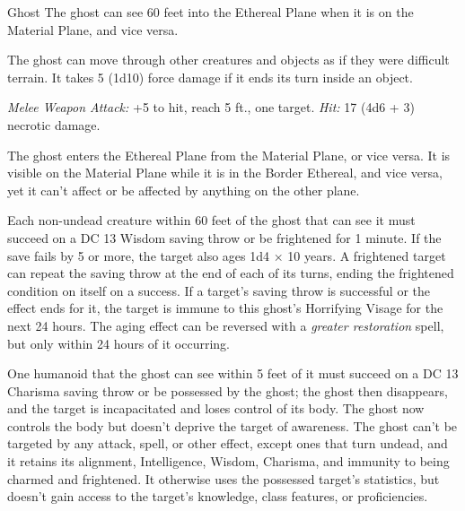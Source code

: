\documentclass[10pt,a4paper,twoside,fancy,bg=print,twocolumn,openany,nodeprecatedcode]{dndbook}
\begin{document}
\begin{DndMonster}[float=t]{Ghost}
\DndMonsterBasics[
armor-class = {11},
hit-points = {\DndDice{10d8}},
speed = {0 ft., fly 40 ft. \textit{(hover)}}
]
\DndMonsterAbilityScores[
 str = 7,
 dex = 13,
 con = 10,
 int = 10,
 wis = 12,
 cha = 17
]
\DndMonsterDetails[
damage-resistances = {acid, fire, lightning, thunder; bludgeoning, piercing, slashing from nonmagical attacks},
damage-immunities = {cold, necrotic, poison},
senses = {darkvision 60 ft., passive perception 11},
languages = {any languages it knew in life},
challenge = 4,
]
The ghost can see 60 feet into the Ethereal Plane when it is on the Material Plane, and vice versa.

The ghost can move through other creatures and objects as if they were difficult terrain. It takes 5 (1d10) force damage if it ends its turn inside an object.

\textsl{Melee Weapon Attack:} +5 to hit, reach 5 ft., one target. \textsl{Hit:} 17 (4d6 + 3) necrotic damage.

The ghost enters the Ethereal Plane from the Material Plane, or vice versa. It is visible on the Material Plane while it is in the Border Ethereal, and vice versa, yet it can't affect or be affected by anything on the other plane.

Each non-undead creature within 60 feet of the ghost that can see it must succeed on a DC 13 Wisdom saving throw or be frightened for 1 minute. If the save fails by 5 or more, the target also ages 1d4 × 10 years. A frightened target can repeat the saving throw at the end of each of its turns, ending the frightened condition on itself on a success. If a target's saving throw is successful or the effect ends for it, the target is immune to this ghost's Horrifying Visage for the next 24 hours. The aging effect can be reversed with a  \textit{greater restoration} spell, but only within 24 hours of it occurring.

One humanoid that the ghost can see within 5 feet of it must succeed on a DC 13 Charisma saving throw or be possessed by the ghost; the ghost then disappears, and the target is incapacitated and loses control of its body. The ghost now controls the body but doesn't deprive the target of awareness. The ghost can't be targeted by any attack, spell, or other effect, except ones that turn undead, and it retains its alignment, Intelligence, Wisdom, Charisma, and immunity to being charmed and frightened. It otherwise uses the possessed target's statistics, but doesn't gain access to the target's knowledge, class features, or proficiencies.


\end{DndMonster}
\end{document}
